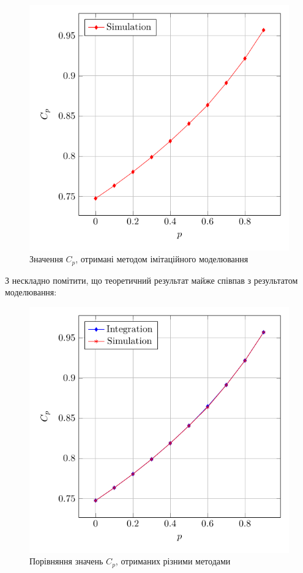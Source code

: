 \begin{figure}[H]
    \centering
    \includegraphics[scale=0.8]{chapter_Practice/img/simul_cp}
    \caption{Значення $C_{p}$, отримані методом імітаційного моделювання}
    \label{fig:simul_cp}
\end{figure}

З  нескладно помітити, що теоретичний результат майже співпав з результатом моделювання:
\begin{figure}[H]
    \centering
    \includegraphics[scale=0.8]{chapter_Practice/img/composite_cp}
    \caption{Порівняння значень $C_{p}$, отриманих різними методами}
    \label{fig:composite_cp}
\end{figure}

